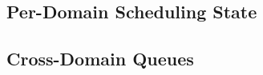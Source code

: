 
\subsection{Per-Domain Scheduling State}
\label{sub:per_domain_state}


\subsection{Cross-Domain Queues}
\label{sub:queues}


